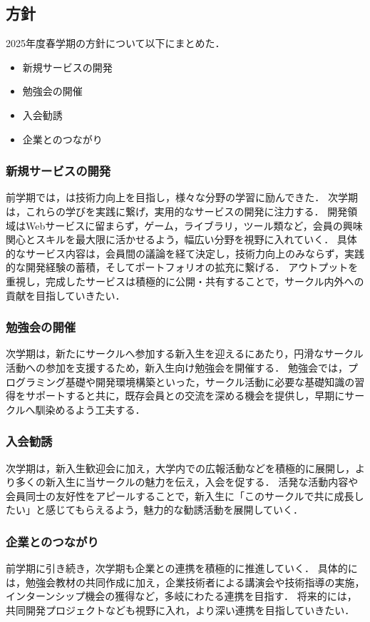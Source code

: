 \subsection*{\firstGrade{}方針}


2025年度春学期の\firstGrade{}方針について以下にまとめた．

\begin{itemize}
	\item 新規サービスの開発
	\item 勉強会の開催
	\item 入会勧誘
	\item 企業とのつながり
\end{itemize}

\subsubsection*{新規サービスの開発}

前学期では，\firstGrade{}は技術力向上を目指し，様々な分野の学習に励んできた．
次学期は，これらの学びを実践に繋げ，実用的なサービスの開発に注力する．
開発領域はWebサービスに留まらず，ゲーム，ライブラリ，ツール類など，会員の興味関心とスキルを最大限に活かせるよう，幅広い分野を視野に入れていく．
具体的なサービス内容は，会員間の議論を経て決定し，技術力向上のみならず，実践的な開発経験の蓄積，そしてポートフォリオの拡充に繋げる．
アウトプットを重視し，完成したサービスは積極的に公開・共有することで，サークル内外への貢献を目指していきたい．

\subsubsection*{勉強会の開催}

次学期は，新たにサークルへ参加する新入生を迎えるにあたり，円滑なサークル活動への参加を支援するため，新入生向け勉強会を開催する．
勉強会では，プログラミング基礎や開発環境構築といった，サークル活動に必要な基礎知識の習得をサポートすると共に，既存会員との交流を深める機会を提供し，早期にサークルへ馴染めるよう工夫する．

\subsubsection*{入会勧誘}

次学期は，新入生歓迎会に加え，大学内での広報活動などを積極的に展開し，より多くの新入生に当サークルの魅力を伝え，入会を促する．
活発な活動内容や会員同士の友好性をアピールすることで，新入生に「このサークルで共に成長したい」と感じてもらえるよう，魅力的な勧誘活動を展開していく．

\subsubsection*{企業とのつながり}

前学期に引き続き，次学期も企業との連携を積極的に推進していく．
具体的には，勉強会教材の共同作成に加え，企業技術者による講演会や技術指導の実施，インターンシップ機会の獲得など，多岐にわたる連携を目指す．
将来的には，共同開発プロジェクトなども視野に入れ，より深い連携を目指していきたい．

